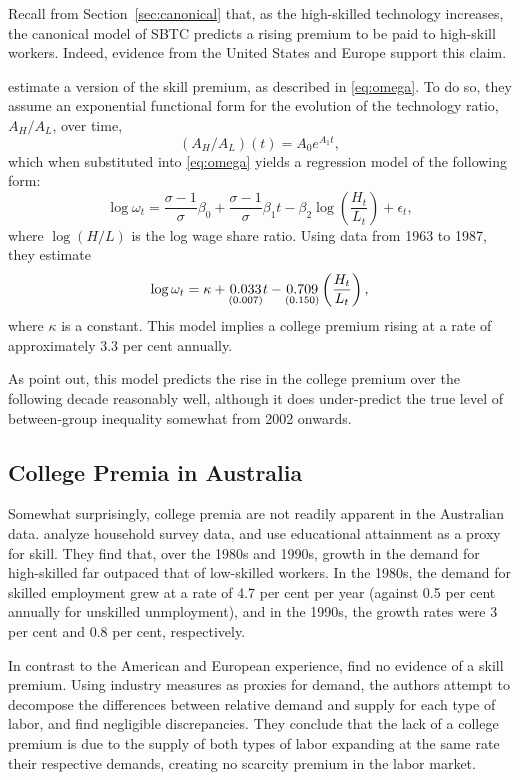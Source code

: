 Recall from Section~\ref{sec:canonical} that, as the high-skilled technology increases, the canonical model of SBTC predicts a rising premium to be paid to high-skill workers. Indeed, evidence from the United States and Europe support this claim.

\citet{Katz1992} estimate a version of the skill premium, as described in \eqref{eq:omega}. To do so, they assume an exponential functional form for the evolution of the technology ratio, $A_H/A_L$, over time,
$$  (A_H/A_L)(t) = A_{0}e^{A_1t}, $$
which when substituted into \eqref{eq:omega} yields a regression model of the following form:
$$ \log \omega_t = \frac{\sigma - 1}{\sigma}\beta_0 + \frac{\sigma-1}{\sigma}\beta_1t - \beta_2\log\left(\frac{H_t}{L_t}\right) + \epsilon_t, $$
where $\log(H/L)$ is the log wage share ratio. Using data from 1963 to 1987, they estimate
$$
  \log \omega_t = \kappa + \underset{\scriptsize (0.007)}{0.033} t - \underset{\scriptsize (0.150)}{0.709}\left( \frac{H_t}{L_t} \right),
$$
where $\kappa$ is a constant. This model implies a college premium rising at a rate of approximately 3.3 per cent annually.

As \citet{Acemoglu2011} point out, this model predicts the rise in the college premium over the following decade reasonably well, although it does under-predict the true level of between-group inequality somewhat from 2002 onwards.

\subsection{College Premia in Australia}

Somewhat surprisingly, college premia are not readily apparent in the Australian data. \citet{Barnes2002} analyze household survey data, and use educational attainment as a proxy for skill. They find that, over the 1980s and 1990s, growth in the demand for high-skilled far outpaced that of low-skilled workers. In the 1980s, the demand for skilled employment grew at a rate of 4.7 per cent per year (against 0.5 per cent annually for unskilled unmployment), and in the 1990s, the growth rates were 3 per cent and 0.8 per cent, respectively.

In contrast to the American and European experience, \citet{Barnes2002} find no evidence of a skill premium. Using industry measures as proxies for demand, the authors attempt to decompose the differences between relative demand and supply for each type of labor, and find negligible discrepancies. They conclude that the lack of a college premium  is due to the supply of both types of labor expanding at the same rate their respective demands, creating no scarcity premium in the labor market.

